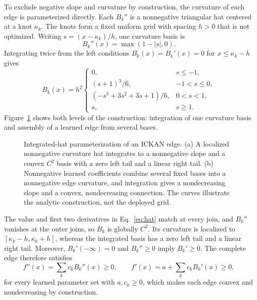 To exclude negative slope and curvature by construction, the curvature of each edge is parameterized directly. Each $B_k''$ is a nonnegative triangular hat centered at a knot $\kappa_k$. The knots form a fixed uniform grid with spacing $h>0$ that is not optimized. Writing $s=(x-\kappa_k)/h$, one curvature basis is
\begin{equation}
 B_k''(x)=\max(1-|s|,0).
 \label{eq:hat_curvature}
\end{equation}
Integrating twice from the left conditions $B_k(x)=B_k'(x)=0$ for $x\leq\kappa_k-h$ gives
\begin{equation}
 B_k(x)=h^2\begin{cases}
 0,&s\leq-1,\\
 (s+1)^3/6,&-1<s\leq0,\\
 (-s^3+3s^2+3s+1)/6,&0<s<1,\\
 s,&s\geq1.
 \end{cases}
 \label{eq:hat}
\end{equation}
Figure~\ref{fig:integrated_hat_construction} shows both levels of the construction: integration of one curvature basis and assembly of a learned edge from several bases.
\begin{figure}[tbp]
 \centering
 \caption{Integrated-hat parameterization of an ICKAN edge. (a) A localized nonnegative curvature hat integrates to a nonnegative slope and a convex $C^2$ basis with a zero left tail and a linear right tail. (b) Nonnegative learned coefficients combine several fixed bases into a nonnegative edge curvature, and integration gives a nondecreasing slope and a convex, nondecreasing connection. The curves illustrate the analytic construction, not the deployed grid.}
 \label{fig:integrated_hat_construction}
\end{figure}

The value and first two derivatives in Eq.~\eqref{eq:hat} match at every join, and $B_k''$ vanishes at the outer joins, so $B_k$ is globally $C^2$. Its curvature is localized to $[\kappa_k-h,\kappa_k+h]$, whereas the integrated basis has a zero left tail and a linear right tail. Moreover, $B_k'(-\infty)=0$ and $B_k''\geq0$ imply $B_k'\geq0$. The complete edge therefore satisfies
\begin{equation}
 f''(x)=\sum_k c_kB_k''(x)\geq0,
 \qquad
 f'(x)=a+\sum_k c_kB_k'(x)\geq0,
 \label{eq:splineedge_guarantees}
\end{equation}
for every learned parameter set with $a,c_k\geq0$, which makes each edge convex and nondecreasing by construction.

